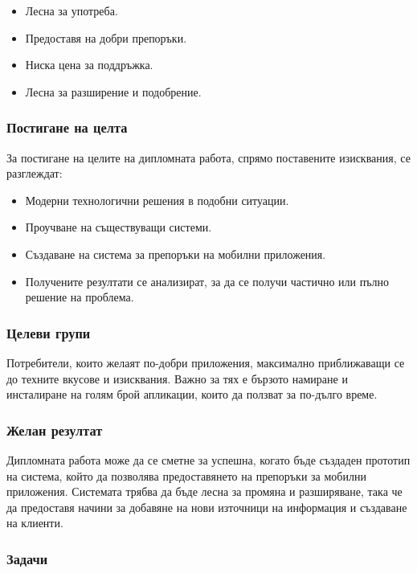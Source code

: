 		\begin{itemize}
			\item Лесна за употреба.
			\item Предоставя на добри препоръки.
			\item Ниска цена за поддръжка.
			\item Лесна за разширение и подобрение.
		\end{itemize}

	\subsubsection{Постигане на целта}

		За постигане на целите на дипломната работа, спрямо поставените изисквания, се разглеждат:
		
		\begin{itemize}
			\item Модерни технологични решения в подобни ситуации.
			\item Проучване на съществуващи системи.
			\item Създаване на система за препоръки на мобилни приложения.
			\item Получените резултати се анализират, за да се получи частично или пълно решение на проблема.
		\end{itemize}

	\subsubsection{Целеви групи}
	
		Потребители, които желаят по-добри приложения, максимално приближаващи се до техните вкусове и изисквания. Важно за тях е бързото намиране и инсталиране на голям брой апликации, които да ползват за по-дълго време.
	
	\subsubsection{Желан резултат}
	
		Дипломната работа може да се сметне за успешна, когато бъде създаден прототип на система, който да позволява 
		предоставянето на препоръки за мобилни приложения. Системата трябва да бъде лесна за промяна и разширяване,
		така че да предоставя начини за добавяне на нови източници на информация и създаване на клиенти.
	
	\subsubsection{Задачи}
		
